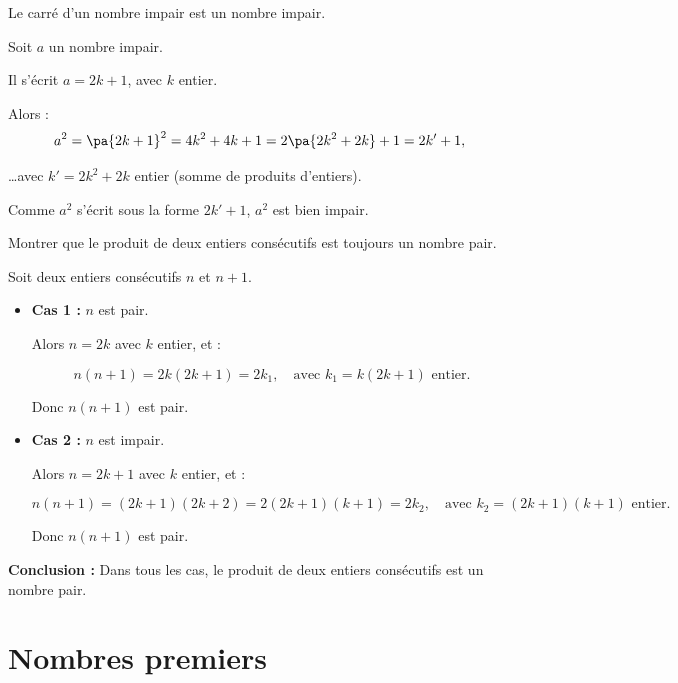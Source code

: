 \begin{prop}
	Le carré d'un nombre impair est un nombre impair.
\end{prop}

\begin{demo}
	Soit $a$ un nombre impair.

	Il s'écrit $a = 2k + 1$, avec $k$ entier.

	Alors :
	\[
		a^2 = \pa{2k + 1}^2 = 4k^2 + 4k + 1 = 2\pa{2k^2 + 2k} + 1 = 2k' + 1,
	\]

	\ldots avec $k' = 2k^2 + 2k$ entier (somme de produits d'entiers).

	Comme $a^2$ s'écrit sous la forme $2k' + 1$, $a^2$ est bien impair.
\end{demo}

\newpage

\begin{methode}
	Montrer que le produit de deux entiers consécutifs est toujours un nombre pair.

	\begin{correction}
		Soit deux entiers consécutifs $n$ et $n + 1$.
		\begin{itemize}
			\item \textbf{Cas 1 :} $n$ est pair.

			      Alors $n = 2k$ avec $k$ entier, et :

			      \[
				      n(n + 1) = 2k(2k + 1) = 2k_1, \quad \text{avec } k_1 = k(2k + 1) \text{ entier}.
			      \]

			      Donc $n(n + 1)$ est pair.

			\item \textbf{Cas 2 :} $n$ est impair.

			      Alors $n = 2k + 1$ avec $k$ entier, et :

			      \[
				      n(n + 1) = (2k + 1)(2k + 2) = 2(2k + 1)(k + 1) = 2k_2, \quad \text{avec } k_2 = (2k + 1)(k + 1) \text{ entier}.
			      \]

			      Donc $n(n + 1)$ est pair.
		\end{itemize}

		\textbf{Conclusion :} Dans tous les cas, le produit de deux entiers consécutifs est un nombre pair.
	\end{correction}
\end{methode}

\section{Nombres premiers}

